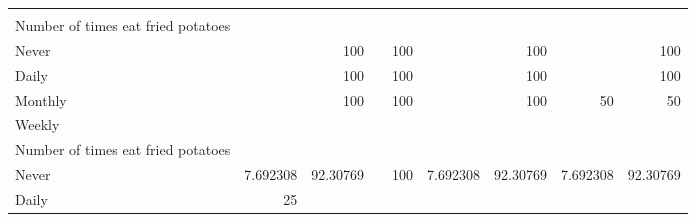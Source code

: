 \documentclass{article}
\begin{document}
\begin{tabular}{lllllllll}
  \multicolumn{1}{r}{} &
  \multicolumn{1}{r}{} \\
\multicolumn{1}{l}{\hspace{6em}Number of times eat fried potatoes} &
  \multicolumn{1}{|r}{} &
  \multicolumn{1}{r}{} &
  \multicolumn{1}{r}{} &
  \multicolumn{1}{r}{} &
  \multicolumn{1}{r}{} &
  \multicolumn{1}{r}{} &
  \multicolumn{1}{r}{} &
  \multicolumn{1}{r}{} \\
\multicolumn{1}{l}{\hspace{7em}Never} &
  \multicolumn{1}{|r}{} &
  \multicolumn{1}{r}{100} &
  \multicolumn{1}{r}{} &
  \multicolumn{1}{r}{100} &
  \multicolumn{1}{r}{} &
  \multicolumn{1}{r}{100} &
  \multicolumn{1}{r}{} &
  \multicolumn{1}{r}{100} \\
\multicolumn{1}{l}{\hspace{7em}Daily} &
  \multicolumn{1}{|r}{} &
  \multicolumn{1}{r}{100} &
  \multicolumn{1}{r}{} &
  \multicolumn{1}{r}{100} &
  \multicolumn{1}{r}{} &
  \multicolumn{1}{r}{100} &
  \multicolumn{1}{r}{} &
  \multicolumn{1}{r}{100} \\
\multicolumn{1}{l}{\hspace{7em}Monthly} &
  \multicolumn{1}{|r}{} &
  \multicolumn{1}{r}{100} &
  \multicolumn{1}{r}{} &
  \multicolumn{1}{r}{100} &
  \multicolumn{1}{r}{} &
  \multicolumn{1}{r}{100} &
  \multicolumn{1}{r}{50} &
  \multicolumn{1}{r}{50} \\
\multicolumn{1}{l}{\hspace{5em}Weekly} &
  \multicolumn{1}{|r}{} &
  \multicolumn{1}{r}{} &
  \multicolumn{1}{r}{} &
  \multicolumn{1}{r}{} &
  \multicolumn{1}{r}{} &
  \multicolumn{1}{r}{} &
  \multicolumn{1}{r}{} &
  \multicolumn{1}{r}{} \\
\multicolumn{1}{l}{\hspace{6em}Number of times eat fried potatoes} &
  \multicolumn{1}{|r}{} &
  \multicolumn{1}{r}{} &
  \multicolumn{1}{r}{} &
  \multicolumn{1}{r}{} &
  \multicolumn{1}{r}{} &
  \multicolumn{1}{r}{} &
  \multicolumn{1}{r}{} &
  \multicolumn{1}{r}{} \\
\multicolumn{1}{l}{\hspace{7em}Never} &
  \multicolumn{1}{|r}{7.692308} &
  \multicolumn{1}{r}{92.30769} &
  \multicolumn{1}{r}{} &
  \multicolumn{1}{r}{100} &
  \multicolumn{1}{r}{7.692308} &
  \multicolumn{1}{r}{92.30769} &
  \multicolumn{1}{r}{7.692308} &
  \multicolumn{1}{r}{92.30769} \\
\multicolumn{1}{l}{\hspace{7em}Daily} &
  \multicolumn{1}{|r}{25} &

\end{tabular}
\end{document}
